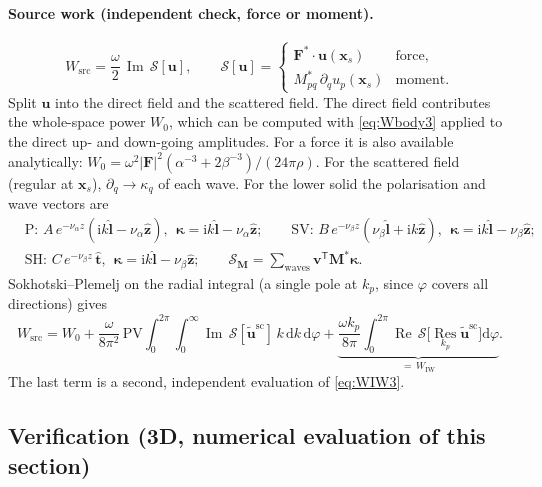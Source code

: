 \documentclass[11pt,a4paper]{article}
\newcommand{\ii}{\mathrm{i}}
\newcommand{\dd}{\mathrm{d}}
\newcommand{\Res}{\operatorname*{Res}}
\newcommand{\RE}{\operatorname{Re}}
\newcommand{\IM}{\operatorname{Im}}
\begin{document}
\paragraph{Source work (independent check, force or moment).}
\begin{equation}
  W_{\mathrm{src}}=\frac{\omega}{2}\,\IM\,\mathcal S[\mathbf u],\qquad
  \mathcal S[\mathbf u]=
  \begin{cases}\mathbf F^{*}\!\cdot\mathbf u(\mathbf x_s) & \text{force},\\
  M^{*}_{pq}\,\partial_qu_p(\mathbf x_s) & \text{moment}.\end{cases}
\end{equation}
Split $\mathbf u$ into the direct field and the scattered field. The direct field contributes the
whole-space power $W_0$, which can be computed with \eqref{eq:Wbody3} applied to the direct up- and
down-going amplitudes. For a force it is also available analytically:
$W_0=\omega^2|\mathbf F|^2(\alpha^{-3}+2\beta^{-3})/(24\pi\rho)$. For the scattered field (regular
at $\mathbf x_s$), $\partial_q\to\kappa_q$ of each wave. For the lower solid the polarisation and wave
vectors are
\begin{align*}
  &\text{P: } A\,e^{-\nu_\alpha z}(\ii k\hat{\mathbf l}-\nu_\alpha\hat{\mathbf z}),\ \
  \bm\kappa=\ii k\hat{\mathbf l}-\nu_\alpha\hat{\mathbf z};\qquad
  \text{SV: } B\,e^{-\nu_\beta z}(\nu_\beta\hat{\mathbf l}+\ii k\hat{\mathbf z}),\ \
  \bm\kappa=\ii k\hat{\mathbf l}-\nu_\beta\hat{\mathbf z};\\
  &\text{SH: } C\,e^{-\nu_\beta z}\,\hat{\mathbf t},\ \ \bm\kappa=\ii k\hat{\mathbf l}-\nu_\beta\hat{\mathbf z};
  \qquad \mathcal S_{\mathbf M}=\textstyle\sum_{\text{waves}}\mathbf v^{\mathsf T}\mathbf M^{*}\bm\kappa .
\end{align*}
Sokhotski--Plemelj on the radial integral (a single pole at $k_p$, since $\varphi$ covers all
directions) gives
\begin{equation}
  W_{\mathrm{src}}=W_0
  +\frac{\omega}{8\pi^2}\,\mathrm{PV}\!\!\int_0^{2\pi}\!\!\!\int_0^{\infty}\IM\,\mathcal S[\tilde{\mathbf u}^{\mathrm{sc}}]\,k\,\dd k\,\dd\varphi
  +\underbrace{\frac{\omega k_p}{8\pi}\int_0^{2\pi}\RE\,\mathcal S\bigl[\Res_{k_p}\tilde{\mathbf u}^{\mathrm{sc}}\bigr]\dd\varphi}_{=\,W_{\mathrm{IW}}}.
  \label{eq:Wsrc3}
\end{equation}
The last term is a second, independent evaluation of \eqref{eq:WIW3}.

\subsection{Verification (3D, numerical evaluation of this section)}
\end{document}

